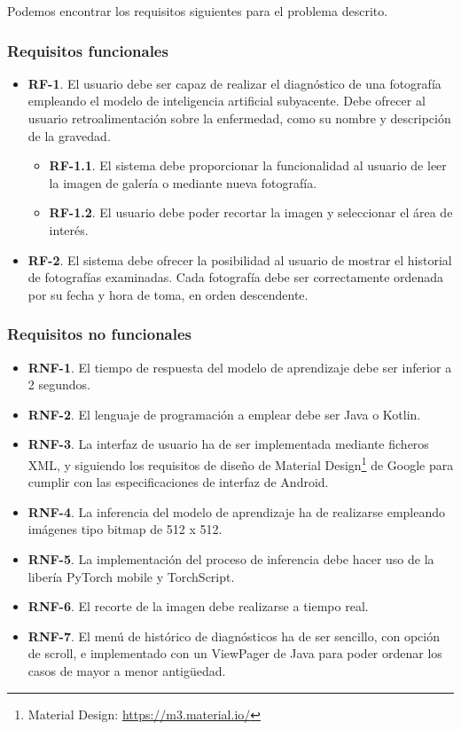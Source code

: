 Podemos encontrar los requisitos siguientes para el problema descrito.

\subsubsection{Requisitos funcionales}

\begin{itemize}
	\item \textbf{RF-1}. El usuario debe ser capaz de realizar el diagnóstico de una fotografía empleando el modelo de inteligencia artificial subyacente. Debe ofrecer al usuario retroalimentación sobre la enfermedad, como su nombre y descripción de la gravedad.
	\begin{itemize}
		\item \textbf{RF-1.1}. El sistema debe proporcionar la funcionalidad al usuario de leer la imagen de galería o mediante nueva fotografía.
		\item \textbf{RF-1.2}. El usuario debe poder recortar la imagen y seleccionar el área de interés.
	\end{itemize}
	\item \textbf{RF-2}. El sistema debe ofrecer la posibilidad al usuario de mostrar el historial de fotografías examinadas. Cada fotografía debe ser correctamente ordenada por su fecha y hora de toma, en orden descendente.
\end{itemize}

\subsubsection{Requisitos no funcionales}
	\begin{itemize}
		\item \textbf{RNF-1}. El tiempo de respuesta del modelo de aprendizaje debe ser inferior a 2 segundos.
		\item \textbf{RNF-2}. El lenguaje de programación a emplear debe ser Java o Kotlin.
		\item \textbf{RNF-3}. La interfaz de usuario ha de ser implementada mediante ficheros XML, y siguiendo los requisitos de diseño de Material Design\footnote{Material Design: \url{https://m3.material.io/}} de Google para cumplir con las especificaciones de interfaz de Android.
		\item \textbf{RNF-4}. La inferencia del modelo de aprendizaje ha de realizarse empleando imágenes tipo bitmap de 512 x 512.
		\item \textbf{RNF-5}. La implementación del proceso de inferencia debe hacer uso de la libería PyTorch mobile y TorchScript.
		\item \textbf{RNF-6}. El recorte de la imagen debe realizarse a tiempo real.
		\item \textbf{RNF-7}. El menú de histórico de diagnósticos ha de ser sencillo, con opción de scroll, e implementado con un ViewPager de Java para poder ordenar los casos de mayor a menor antigüedad.
	\end{itemize}
